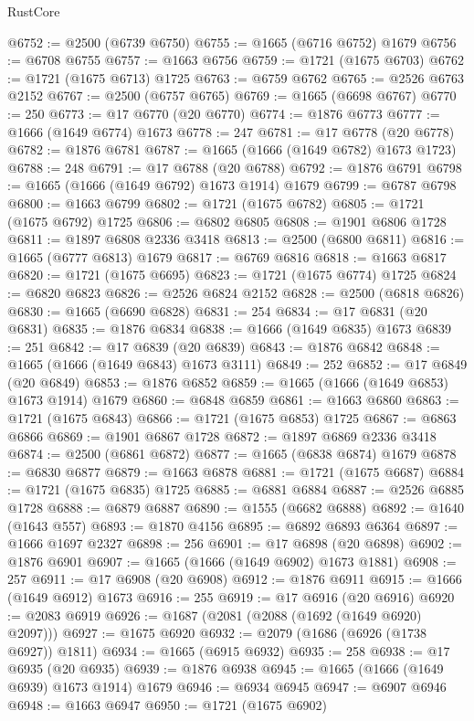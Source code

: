 \begin{lexlean}{RustCore}
\begin{coremodule}
@6752 := @2500 (@6739 @6750)
@6755 := @1665 (@6716 @6752) @1679
@6756 := @6708 @6755
@6757 := @1663 @6756
@6759 := @1721 (@1675 @6703)
@6762 := @1721 (@1675 @6713) @1725
@6763 := @6759 @6762
@6765 := @2526 @6763 @2152
@6767 := @2500 (@6757 @6765)
@6769 := @1665 (@6698 @6767)
@6770 := 250
@6773 := @17 @6770 (@20 @6770)
@6774 := @1876 @6773
@6777 := @1666 (@1649 @6774) @1673
@6778 := 247
@6781 := @17 @6778 (@20 @6778)
@6782 := @1876 @6781
@6787 := @1665 (@1666 (@1649 @6782) @1673 @1723)
@6788 := 248
@6791 := @17 @6788 (@20 @6788)
@6792 := @1876 @6791
@6798 := @1665 (@1666 (@1649 @6792) @1673 @1914) @1679
@6799 := @6787 @6798
@6800 := @1663 @6799
@6802 := @1721 (@1675 @6782)
@6805 := @1721 (@1675 @6792) @1725
@6806 := @6802 @6805
@6808 := @1901 @6806 @1728
@6811 := @1897 @6808 @2336 @3418
@6813 := @2500 (@6800 @6811)
@6816 := @1665 (@6777 @6813) @1679
@6817 := @6769 @6816
@6818 := @1663 @6817
@6820 := @1721 (@1675 @6695)
@6823 := @1721 (@1675 @6774) @1725
@6824 := @6820 @6823
@6826 := @2526 @6824 @2152
@6828 := @2500 (@6818 @6826)
@6830 := @1665 (@6690 @6828)
@6831 := 254
@6834 := @17 @6831 (@20 @6831)
@6835 := @1876 @6834
@6838 := @1666 (@1649 @6835) @1673
@6839 := 251
@6842 := @17 @6839 (@20 @6839)
@6843 := @1876 @6842
@6848 := @1665 (@1666 (@1649 @6843) @1673 @3111)
@6849 := 252
@6852 := @17 @6849 (@20 @6849)
@6853 := @1876 @6852
@6859 := @1665 (@1666 (@1649 @6853) @1673 @1914) @1679
@6860 := @6848 @6859
@6861 := @1663 @6860
@6863 := @1721 (@1675 @6843)
@6866 := @1721 (@1675 @6853) @1725
@6867 := @6863 @6866
@6869 := @1901 @6867 @1728
@6872 := @1897 @6869 @2336 @3418
@6874 := @2500 (@6861 @6872)
@6877 := @1665 (@6838 @6874) @1679
@6878 := @6830 @6877
@6879 := @1663 @6878
@6881 := @1721 (@1675 @6687)
@6884 := @1721 (@1675 @6835) @1725
@6885 := @6881 @6884
@6887 := @2526 @6885 @1728
@6888 := @6879 @6887
@6890 := @1555 (@6682 @6888)
@6892 := @1640 (@1643 @557)
@6893 := @1870 @4156
@6895 := @6892 @6893 @6364
@6897 := @1666 @1697 @2327
@6898 := 256
@6901 := @17 @6898 (@20 @6898)
@6902 := @1876 @6901
@6907 := @1665 (@1666 (@1649 @6902) @1673 @1881)
@6908 := 257
@6911 := @17 @6908 (@20 @6908)
@6912 := @1876 @6911
@6915 := @1666 (@1649 @6912) @1673
@6916 := 255
@6919 := @17 @6916 (@20 @6916)
@6920 := @2083 @6919
@6926 := @1687 (@2081 (@2088 (@1692 (@1649 @6920) @2097)))
@6927 := @1675 @6920
@6932 := @2079 (@1686 (@6926 (@1738 @6927)) @1811)
@6934 := @1665 (@6915 @6932)
@6935 := 258
@6938 := @17 @6935 (@20 @6935)
@6939 := @1876 @6938
@6945 := @1665 (@1666 (@1649 @6939) @1673 @1914) @1679
@6946 := @6934 @6945
@6947 := @6907 @6946
@6948 := @1663 @6947
@6950 := @1721 (@1675 @6902)

\end{coremodule}
\end{lexlean}

